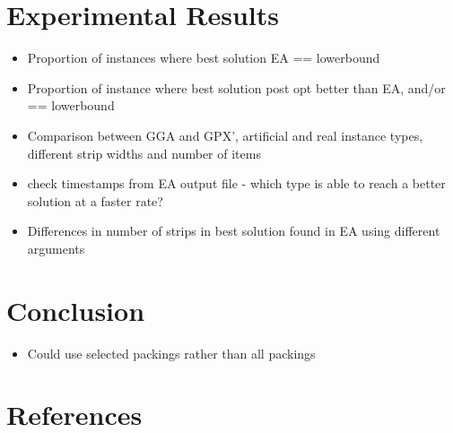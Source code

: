 \documentclass{elsarticle}
\begin{document}
\section{Experimental Results}
\begin{itemize}
	\item Proportion of instances where best solution EA == lowerbound
	\item Proportion of instance where best solution post opt better than EA, and/or == lowerbound
	\item Comparison between GGA and GPX', artificial and real instance types, different strip widths and number of items
	\item check timestamps from EA output file - which type is able to reach a better solution at a faster rate?
	\item Differences in number of strips in best solution found in EA using different arguments
\end{itemize}

\section{Conclusion}
\begin{itemize}
	\item Could use selected packings rather than all packings
\end{itemize}


\section*{References}

\end{document}
